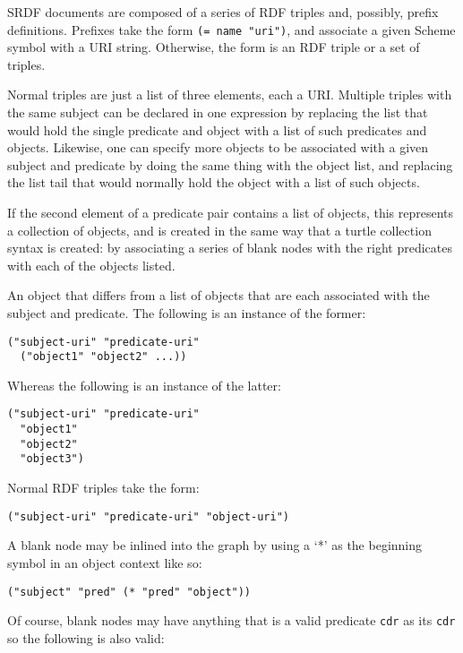 \documentclass[9pt,cm,twocolumn,preprint]{sigplanconf}
\begin{document}
SRDF documents are composed of a series of RDF triples and, possibly,
prefix definitions. Prefixes take the form
{\tt (= name "uri")}, and associate a given Scheme
symbol with a URI string. Otherwise, the form is an RDF triple or a set
of triples.

Normal triples are just a list of three elements, each a URI.
Multiple triples with the same subject can be declared in one 
expression by replacing the list that would hold the single
predicate and object with a list of such predicates and objects.
Likewise, one can specify more objects to be associated with a
given subject and predicate by doing the same thing with the
object list, and replacing the list tail that would normally hold the
object with a list of such objects.

If the second element of a predicate pair contains a list of objects, this
represents a collection of objects, and is created in the same
way that a turtle collection syntax is created: by associating
a series of blank nodes with the right predicates with each of
the objects listed.

An object that differs from a list of objects that are each associated
with the subject and predicate. The following is an instance of
the former:

\begin{verbatim}
("subject-uri" "predicate-uri"
  ("object1" "object2" ...))
\end{verbatim}

\noindent Whereas the following is an instance of the latter:

\begin{verbatim}
("subject-uri" "predicate-uri"
  "object1"
  "object2"
  "object3")
\end{verbatim}

Normal RDF triples take the form:

\begin{verbatim}
("subject-uri" "predicate-uri" "object-uri")
\end{verbatim}

\noindent A blank node may be inlined into the graph by using a `*' as the
beginning symbol in an object context like so:

\begin{verbatim}
("subject" "pred" (* "pred" "object"))
\end{verbatim}

\noindent Of course, blank nodes may have anything that is a valid predicate
{\tt cdr} as its {\tt cdr} so the following is also valid:
\end{document}
